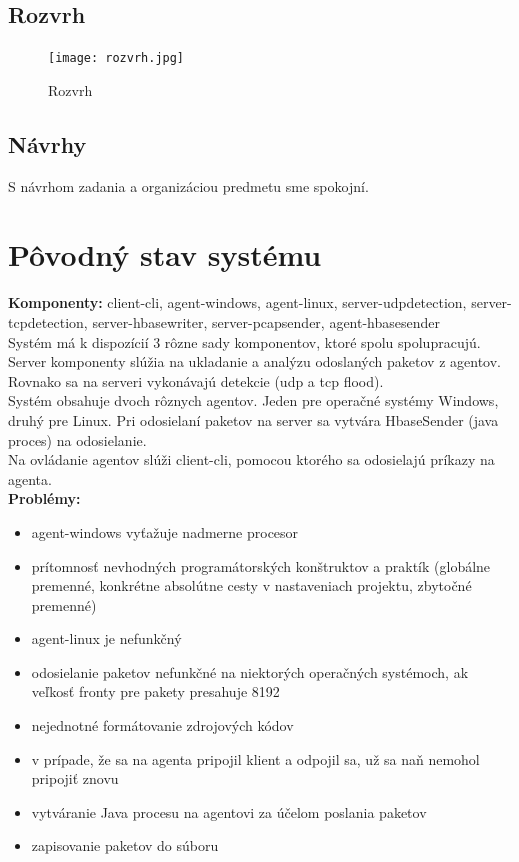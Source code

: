 \documentclass[a4paper,12pt]{article}
\begin{document}
\subsection{Rozvrh}
\begin{figure}[h!]
	\centering
	\label{graf1}
	\texttt{[image: rozvrh.jpg]}
	\caption{Rozvrh}
\end{figure}

\subsection{Návrhy}
S návrhom zadania a organizáciou predmetu sme spokojní. \\
\newpage

\section{Pôvodný stav systému}
\textbf{Komponenty:} client-cli, agent-windows, agent-linux, server-udpdetection, server-tcpdetection, server-hbasewriter, server-pcapsender, agent-hbasesender \\

Systém má k dispozícií 3 rôzne sady komponentov, ktoré spolu spolupracujú.
Server komponenty slúžia na ukladanie a analýzu odoslaných paketov z agentov. Rovnako sa na serveri vykonávajú detekcie (udp a tcp flood). \\

Systém obsahuje dvoch rôznych agentov. Jeden pre operačné systémy Windows, druhý pre Linux. Pri odosielaní paketov na server sa vytvára HbaseSender (java proces) na odosielanie. \\

Na ovládanie agentov slúži client-cli, pomocou ktorého sa odosielajú príkazy na agenta. \\

\noindent \textbf{Problémy:}

\begin{itemize} 
	\item agent-windows vyťažuje nadmerne procesor
	\item prítomnosť nevhodných programátorských konštruktov a praktík (globálne premenné, konkrétne absolútne cesty v nastaveniach projektu, zbytočné premenné)
	\item agent-linux je nefunkčný
	\item odosielanie paketov nefunkčné na niektorých operačných systémoch, ak veľkosť fronty pre pakety presahuje 8192
	\item nejednotné formátovanie zdrojových kódov 
	\item v prípade, že sa na agenta pripojil klient a odpojil sa, už sa naň nemohol pripojiť znovu 
	\item vytváranie Java procesu na agentovi za účelom poslania paketov 
	\item zapisovanie paketov do súboru \\
\end{itemize}
\end{document}
